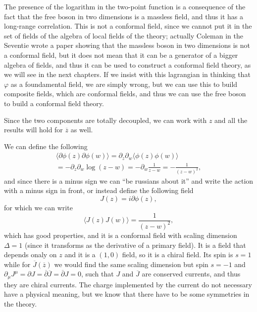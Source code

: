 \begin{remark}
    The presence of the logarithm in the two-point function is a consequence of the fact that the free boson in two dimensions is a massless field, and thus it has a long-range correlation. This is not a conformal field, since we cannot put it in the set of fields of the algebra of local fields of the theory; actually Coleman in the Seventie wrote a paper showing that the massless boson in two dimensions is not a conformal field, but it does not mean that it can be a generator of a bigger algebra of fields, and thus it can be used to construct a conformal field theory, as we will see in the next chapters. If we insist with this lagrangian in thinking that \(\varphi\) as a foundamental field, we are simply wrong, but we can use this to build composite fields, which are conformal fields, and thus we can use the free boson to build a conformal field theory.
\end{remark}

Since the two components are totally decoupled, we can work with \(z\) and all the results will hold for \(\overline{z}\) as well.

We can define the following
\[
    \begin{aligned}
        \langle \partial \phi(z) \partial \phi(w) \rangle = \partial_z \partial_w \langle \phi(z) \phi(w) \rangle \\
        = - \partial_z \partial_w \log (z - w) = - \partial_w \frac{1}{z - w} = - \frac{1}{(z - w)^2},
    \end{aligned}
\]
and since there is a minus sign we can ``be russians about it'' and write the action with a minus sign in front, or instead define the following field
\[
    J(z) = i \partial \phi(z),
\]
for which we can write
\[
    \langle J(z) J(w) \rangle = \frac{1}{(z - w)^2},
\]
which has good properties, and it is a conformal field with scaling dimension \(\Delta = 1\) (since it transforms as the derivative of a primary field). It is a field that depends onaly on \(z\) and it is a \((1,0)\) field, so it is a chiral field. Its spin is \(s=1\) while for \(\overline{J}(\overline{z})\) we would find the same scaling dimension but spin \(s=-1\) and
\(\partial_\mu J^{\mu} = \partial J = \overline{\partial} \overline{J} =\overline{\partial} J = 0\), such that \(J\) and \(\overline{J}\) are conserved currents, and thus they are chiral currents. The charge implemented by the current do not necessary have a physical meaning, but we know that there have to be some symmetries in the theory.


